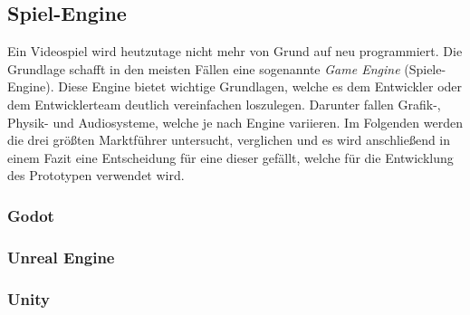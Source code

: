 \subsection{Spiel-Engine}
Ein Videospiel wird heutzutage nicht mehr von Grund auf neu programmiert. Die Grundlage schafft in den meisten Fällen eine sogenannte \textit{Game Engine} (Spiele-Engine). Diese Engine bietet wichtige Grundlagen, welche es dem Entwickler oder dem Entwicklerteam deutlich vereinfachen loszulegen. Darunter fallen Grafik-, Physik- und Audiosysteme, welche je nach Engine variieren. Im Folgenden werden die drei größten Marktführer untersucht, verglichen und es wird anschließend in einem Fazit eine Entscheidung für eine dieser gefällt, welche für die Entwicklung des Prototypen verwendet wird.

\subsubsection{Godot}

\subsubsection{Unreal Engine}

\subsubsection{Unity}